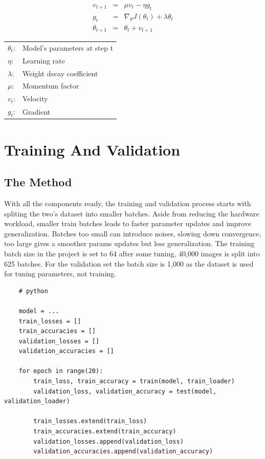 \documentclass{report}
\begin{document}
\[
\begin{array}{rcl}
    v_{t+1}      & = & \mu v_t - \eta g_t                               \\ [0.2cm]
    g_t          & = & \nabla_{\theta} J(\theta_t) + \lambda \theta_t   \\ [0.2cm]
    \theta_{t+1} & = & \theta_t + v_{t+1}  
\end{array}
\]

\begin{center}
    \begin{tabular}{ll}
        $\theta_t$: & Model's parameters at step t      \\
        $\eta$:     & Learning rate                     \\
        $\lambda$:  & Weight decay coefficient          \\
        $\mu$:      & Momentum factor                   \\
        $v_t$:      & Velocity                          \\
        $g_t$:      & Gradient 
    \end{tabular}   
\end{center}

\section{Training And Validation}
\subsection{The Method}
With all the components ready, the training and validation process starts with spliting the two's dataset into 
smaller batches. Aside from reducing the hardware workload, smaller train batches leads to faster parameter 
updates and improve generalization. Batches too small can introduce noises, slowing down convergence, too 
large gives a smoother params updates but less generalization. The training batch size in the project is set to 
64 after some tuning, 40,000 images is split into 625 batches. For the validation set the batch size is 1,000 as 
the dataset is used for tuning parameters, not training.  

\begin{verbatim}
    # python

    model = ...
    train_losses = []
    train_accuracies = []
    validation_losses = []
    validation_accuracies = []

    for epoch in range(20):
        train_loss, train_accuracy = train(model, train_loader)
        validation_loss, validation_accuracy = test(model, validation_loader)

        train_losses.extend(train_loss)
        train_accuracies.extend(train_accuracy)
        validation_losses.append(validation_loss)
        validation_accuracies.append(validation_accuracy)
\end{verbatim}
\end{document}
